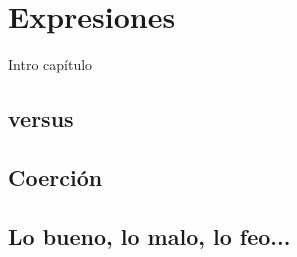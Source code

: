 \chapter{Expresiones}

\label{Chapter5}


Intro capítulo


\section{\code{==} versus \code{===}}

\section{Coerción}

\section{Lo bueno, lo malo, lo feo...}